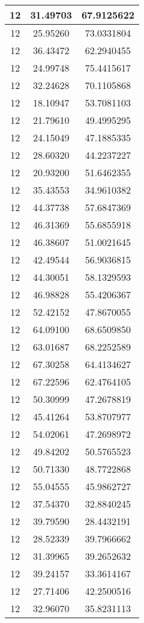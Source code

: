 \documentclass[
]{book}
\begin{document}
\begin{tabular}{c|c|c}
\hline
12 & 31.49703 & 67.9125622\\
\hline
12 & 25.95260 & 73.0331804\\
\hline
12 & 36.43472 & 62.2940455\\
\hline
12 & 24.99748 & 75.4415617\\
\hline
12 & 32.24628 & 70.1105868\\
\hline
12 & 18.10947 & 53.7081103\\
\hline
12 & 21.79610 & 49.4995295\\
\hline
12 & 24.15049 & 47.1885335\\
\hline
12 & 28.60320 & 44.2237227\\
\hline
12 & 20.93200 & 51.6462355\\
\hline
12 & 35.43553 & 34.9610382\\
\hline
12 & 44.37738 & 57.6847369\\
\hline
12 & 46.31369 & 55.6855918\\
\hline
12 & 46.38607 & 51.0021645\\
\hline
12 & 42.49544 & 56.9036815\\
\hline
12 & 44.30051 & 58.1329593\\
\hline
12 & 46.98828 & 55.4206367\\
\hline
12 & 52.42152 & 47.8670055\\
\hline
12 & 64.09100 & 68.6509850\\
\hline
12 & 63.01687 & 68.2252589\\
\hline
12 & 67.30258 & 64.4134627\\
\hline
12 & 67.22596 & 62.4764105\\
\hline
12 & 50.30999 & 47.2678819\\
\hline
12 & 45.41264 & 53.8707977\\
\hline
12 & 54.02061 & 47.2698972\\
\hline
12 & 49.84202 & 50.5765523\\
\hline
12 & 50.71330 & 48.7722868\\
\hline
12 & 55.04555 & 45.9862727\\
\hline
12 & 37.54370 & 32.8840245\\
\hline
12 & 39.79590 & 28.4432191\\
\hline
12 & 28.52339 & 39.7966662\\
\hline
12 & 31.39965 & 39.2652632\\
\hline
12 & 39.24157 & 33.3614167\\
\hline
12 & 27.71406 & 42.2500516\\
\hline
12 & 32.96070 & 35.8231113\\

\end{tabular}
\end{document}
